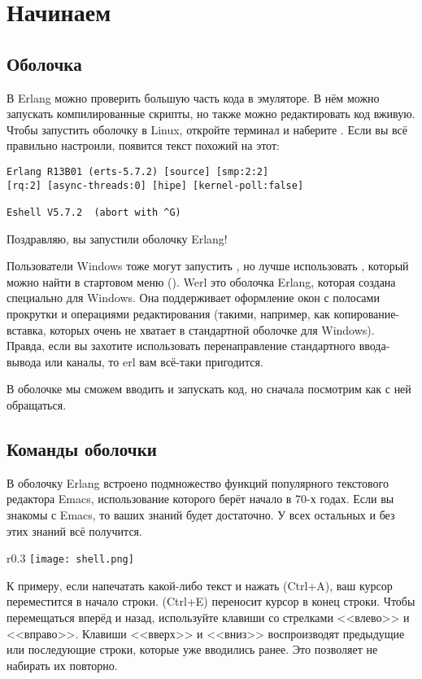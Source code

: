\chapter{Начинаем}
\label{starting-out}
\section{Оболочка}
\label{the-shell}
В Erlang можно проверить большую часть кода в эмуляторе.
В нём можно запускать компилированные скрипты, но также можно редактировать код вживую.
Чтобы запустить оболочку в Linux, откройте терминал и наберите .
Если вы всё правильно настроили, появится текст похожий на этот: 
\begin{lstlisting}[style=repl]
Erlang R13B01 (erts-5.7.2) [source] [smp:2:2] 
[rq:2] [async-threads:0] [hipe] [kernel-poll:false] 
 
Eshell V5.7.2  (abort with ^G) 
\end{lstlisting}

Поздравляю, вы запустили оболочку Erlang! 

Пользователи Windows тоже могут запустить , но лучше использовать , который можно найти в стартовом меню ().
Werl это оболочка Erlang, которая создана специально для Windows.
Она поддерживает оформление окон с полосами прокрутки и операциями редактирования (такими, например, как копирование\--вставка, которых очень не хватает в стандартной оболочке  для Windows).
Правда, если вы захотите использовать перенаправление стандартного ввода\--вывода или каналы, то erl вам всё\--таки пригодится. 

В оболочке мы сможем вводить и запускать код, но сначала посмотрим как с ней обращаться.
\section{Команды оболочки}
\label{shell-commands}
В оболочку Erlang встроено подмножество функций популярного текстового редактора Emacs, использование которого берёт начало в 70\--х годах.
Если вы знакомы с Emacs, то ваших знаний будет достаточно.
У всех остальных и без этих знаний всё получится.

\begin{wrapfigure}{r}{0.3\linewidth}
    \texttt{[image: shell.png]}
\end{wrapfigure}
К примеру, если напечатать какой\--либо текст и нажать (Ctrl+A), ваш курсор переместится в начало строки.
(Ctrl+E) переносит курсор в конец строки.
Чтобы перемещаться вперёд и назад, используйте клавиши со стрелками <<влево>> и <<вправо>>.
Клавиши <<вверх>> и <<вниз>> воспроизводят предыдущие или последующие строки, которые уже вводились ранее. Это позволяет не набирать их повторно.

